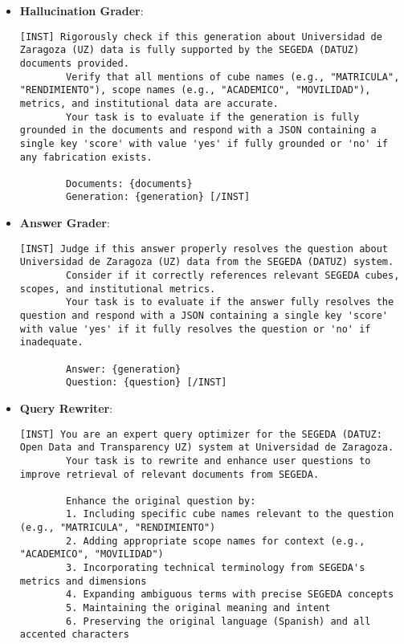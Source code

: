 \begin{itemize}
\begin{lstlisting}[breaklines=true,basicstyle=\small\ttfamily]
        Document: {document}
        Question: {question} [/INST]
    \end{lstlisting}

    \item \textbf{Hallucination Grader}:
    \begin{lstlisting}[breaklines=true,basicstyle=\small\ttfamily]
[INST] Rigorously check if this generation about Universidad de Zaragoza (UZ) data is fully supported by the SEGEDA (DATUZ) documents provided.
        Verify that all mentions of cube names (e.g., "MATRICULA", "RENDIMIENTO"), scope names (e.g., "ACADEMICO", "MOVILIDAD"), metrics, and institutional data are accurate.
        Your task is to evaluate if the generation is fully grounded in the documents and respond with a JSON containing a single key 'score' with value 'yes' if fully grounded or 'no' if any fabrication exists.
        
        Documents: {documents}
        Generation: {generation} [/INST]
    \end{lstlisting}

    \item \textbf{Answer Grader}:
    \begin{lstlisting}[breaklines=true,basicstyle=\small\ttfamily]
[INST] Judge if this answer properly resolves the question about Universidad de Zaragoza (UZ) data from the SEGEDA (DATUZ) system.
        Consider if it correctly references relevant SEGEDA cubes, scopes, and institutional metrics.
        Your task is to evaluate if the answer fully resolves the question and respond with a JSON containing a single key 'score' with value 'yes' if it fully resolves the question or 'no' if inadequate.
        
        Answer: {generation}
        Question: {question} [/INST]
    \end{lstlisting}

    \item \textbf{Query Rewriter}:
    \begin{lstlisting}[breaklines=true,basicstyle=\small\ttfamily]
[INST] You are an expert query optimizer for the SEGEDA (DATUZ: Open Data and Transparency UZ) system at Universidad de Zaragoza.
        Your task is to rewrite and enhance user questions to improve retrieval of relevant documents from SEGEDA.

        Enhance the original question by:
        1. Including specific cube names relevant to the question (e.g., "MATRICULA", "RENDIMIENTO")
        2. Adding appropriate scope names for context (e.g., "ACADEMICO", "MOVILIDAD")
        3. Incorporating technical terminology from SEGEDA's metrics and dimensions
        4. Expanding ambiguous terms with precise SEGEDA concepts
        5. Maintaining the original meaning and intent
        6. Preserving the original language (Spanish) and all accented characters


\end{lstlisting}
\end{itemize}
